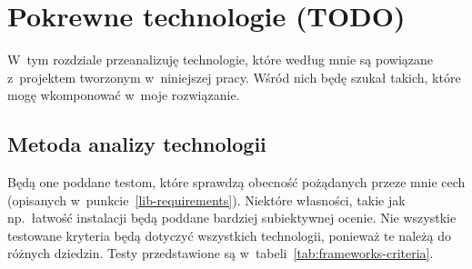 
\chapter{Pokrewne technologie (TODO)}
W~tym rozdziale przeanalizuję technologie, które według mnie są powiązane z~projektem tworzonym w~niniejszej pracy.
Wśród nich będę szukał takich, które mogę wkomponować w~moje rozwiązanie.

\section{Metoda analizy technologii}
Będą one poddane testom, które sprawdzą obecność pożądanych przeze mnie cech (opisanych w~punkcie~\ref{lib-requirements}).
Niektóre własności, takie jak np.\ łatwość instalacji będą poddane bardziej subiektywnej ocenie.
Nie wszystkie testowane kryteria będą dotyczyć wszystkich technologii, ponieważ te należą do różnych dziedzin.
Testy przedstawione są w~tabeli~\ref{tab:frameworks-criteria}.

